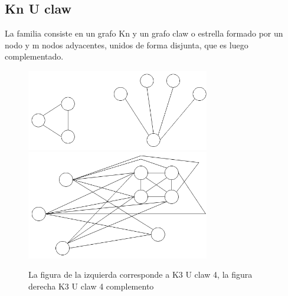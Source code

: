 \subsection{Kn U claw}
La familia consiste en un grafo Kn y un grafo claw o estrella formado por un nodo y m nodos adyacentes, 
unidos de forma disjunta, que es luego complementado.
\begin{figure}[H]
\includegraphics[width=80mm]{K3UC4.png}
\includegraphics[width=80mm]{K3UC4Complemento.png}
\caption{La figura de la izquierda corresponde a K3 U claw 4, la figura derecha K3 U claw 4 complemento}
\label{overflow}
\end{figure}